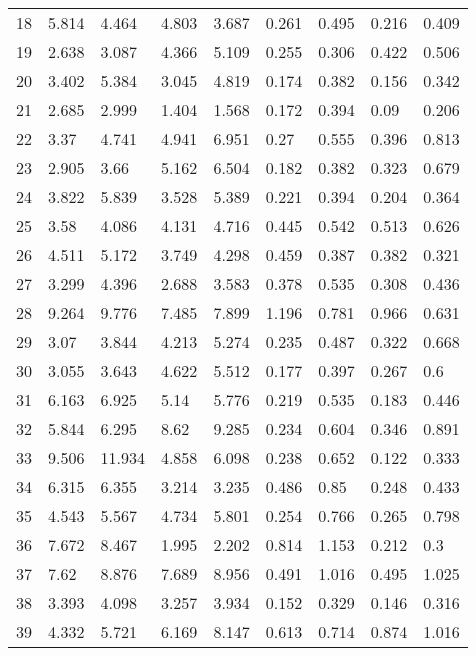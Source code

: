 \begin{longtable}{|l|l|l|l|l|l|l|l|l|}
        18 & 5.814 & 4.464 & 4.803 & 3.687 & 0.261 & 0.495 & 0.216 & 0.409 \\ 
        19 & 2.638 & 3.087 & 4.366 & 5.109 & 0.255 & 0.306 & 0.422 & 0.506 \\ 
        20 & 3.402 & 5.384 & 3.045 & 4.819 & 0.174 & 0.382 & 0.156 & 0.342 \\ 
        21 & 2.685 & 2.999 & 1.404 & 1.568 & 0.172 & 0.394 & 0.09 & 0.206 \\ 
        22 & 3.37 & 4.741 & 4.941 & 6.951 & 0.27 & 0.555 & 0.396 & 0.813 \\ 
        23 & 2.905 & 3.66 & 5.162 & 6.504 & 0.182 & 0.382 & 0.323 & 0.679 \\ 
        24 & 3.822 & 5.839 & 3.528 & 5.389 & 0.221 & 0.394 & 0.204 & 0.364 \\ 
        25 & 3.58 & 4.086 & 4.131 & 4.716 & 0.445 & 0.542 & 0.513 & 0.626 \\ 
        26 & 4.511 & 5.172 & 3.749 & 4.298 & 0.459 & 0.387 & 0.382 & 0.321 \\ 
        27 & 3.299 & 4.396 & 2.688 & 3.583 & 0.378 & 0.535 & 0.308 & 0.436 \\ 
        28 & 9.264 & 9.776 & 7.485 & 7.899 & 1.196 & 0.781 & 0.966 & 0.631 \\ 
        29 & 3.07 & 3.844 & 4.213 & 5.274 & 0.235 & 0.487 & 0.322 & 0.668 \\ 
        30 & 3.055 & 3.643 & 4.622 & 5.512 & 0.177 & 0.397 & 0.267 & 0.6 \\ 
        31 & 6.163 & 6.925 & 5.14 & 5.776 & 0.219 & 0.535 & 0.183 & 0.446 \\ 
        32 & 5.844 & 6.295 & 8.62 & 9.285 & 0.234 & 0.604 & 0.346 & 0.891 \\ 
        33 & 9.506 & 11.934 & 4.858 & 6.098 & 0.238 & 0.652 & 0.122 & 0.333 \\ 
        34 & 6.315 & 6.355 & 3.214 & 3.235 & 0.486 & 0.85 & 0.248 & 0.433 \\ 
        35 & 4.543 & 5.567 & 4.734 & 5.801 & 0.254 & 0.766 & 0.265 & 0.798 \\ 
        36 & 7.672 & 8.467 & 1.995 & 2.202 & 0.814 & 1.153 & 0.212 & 0.3 \\ 
        37 & 7.62 & 8.876 & 7.689 & 8.956 & 0.491 & 1.016 & 0.495 & 1.025 \\ 
        38 & 3.393 & 4.098 & 3.257 & 3.934 & 0.152 & 0.329 & 0.146 & 0.316 \\ 
        39 & 4.332 & 5.721 & 6.169 & 8.147 & 0.613 & 0.714 & 0.874 & 1.016 \\ 

\end{longtable}
